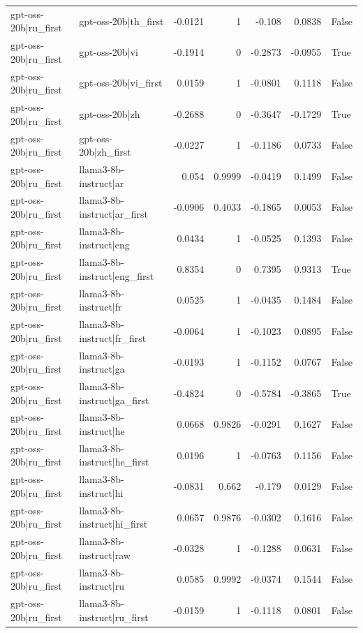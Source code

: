 \begin{table}
\begin{tabular}{l l r r r r l}
gpt-oss-20b|ru_first & gpt-oss-20b|th_first & -0.0121 & 1 & -0.108 & 0.0838 & False \\
gpt-oss-20b|ru_first & gpt-oss-20b|vi & -0.1914 & 0 & -0.2873 & -0.0955 & True \\
gpt-oss-20b|ru_first & gpt-oss-20b|vi_first & 0.0159 & 1 & -0.0801 & 0.1118 & False \\
gpt-oss-20b|ru_first & gpt-oss-20b|zh & -0.2688 & 0 & -0.3647 & -0.1729 & True \\
gpt-oss-20b|ru_first & gpt-oss-20b|zh_first & -0.0227 & 1 & -0.1186 & 0.0733 & False \\
gpt-oss-20b|ru_first & llama3-8b-instruct|ar & 0.054 & 0.9999 & -0.0419 & 0.1499 & False \\
gpt-oss-20b|ru_first & llama3-8b-instruct|ar_first & -0.0906 & 0.4033 & -0.1865 & 0.0053 & False \\
gpt-oss-20b|ru_first & llama3-8b-instruct|eng & 0.0434 & 1 & -0.0525 & 0.1393 & False \\
gpt-oss-20b|ru_first & llama3-8b-instruct|eng_first & 0.8354 & 0 & 0.7395 & 0.9313 & True \\
gpt-oss-20b|ru_first & llama3-8b-instruct|fr & 0.0525 & 1 & -0.0435 & 0.1484 & False \\
gpt-oss-20b|ru_first & llama3-8b-instruct|fr_first & -0.0064 & 1 & -0.1023 & 0.0895 & False \\
gpt-oss-20b|ru_first & llama3-8b-instruct|ga & -0.0193 & 1 & -0.1152 & 0.0767 & False \\
gpt-oss-20b|ru_first & llama3-8b-instruct|ga_first & -0.4824 & 0 & -0.5784 & -0.3865 & True \\
gpt-oss-20b|ru_first & llama3-8b-instruct|he & 0.0668 & 0.9826 & -0.0291 & 0.1627 & False \\
gpt-oss-20b|ru_first & llama3-8b-instruct|he_first & 0.0196 & 1 & -0.0763 & 0.1156 & False \\
gpt-oss-20b|ru_first & llama3-8b-instruct|hi & -0.0831 & 0.662 & -0.179 & 0.0129 & False \\
gpt-oss-20b|ru_first & llama3-8b-instruct|hi_first & 0.0657 & 0.9876 & -0.0302 & 0.1616 & False \\
gpt-oss-20b|ru_first & llama3-8b-instruct|raw & -0.0328 & 1 & -0.1288 & 0.0631 & False \\
gpt-oss-20b|ru_first & llama3-8b-instruct|ru & 0.0585 & 0.9992 & -0.0374 & 0.1544 & False \\
gpt-oss-20b|ru_first & llama3-8b-instruct|ru_first & -0.0159 & 1 & -0.1118 & 0.0801 & False \\

\end{tabular}
\end{table}
